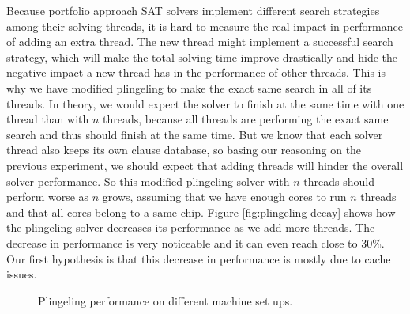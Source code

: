 \documentclass[12pt]{diicc}
\begin{document}
Because portfolio approach SAT solvers implement different search strategies among their solving threads, it is hard to measure the real impact in performance of adding an extra thread. The new thread might implement a successful search strategy, which will make the total solving time improve drastically and hide the negative impact a new thread has in the performance of other threads. This is why we have modified plingeling to make the exact same search in all of its threads. In theory, we would expect the solver to finish at the same time with one thread than with $n$ threads, because all threads are performing the exact same search and thus should finish at the same time. But we know that each solver thread also keeps its own clause database, so basing our reasoning on the previous experiment, we should expect that adding threads will hinder the overall solver performance. So this modified plingeling solver with $n$ threads should perform worse as $n$ grows, assuming that we have enough cores to run $n$ threads and that all cores belong to a same chip. Figure \ref{fig:plingeling decay} shows how the plingeling solver decreases its performance as we add more threads. The decrease in performance is very noticeable and it can even reach close to 30\%. Our first hypothesis is that this decrease in performance is mostly due to cache issues.

\begin{figure}[h!]
\begin{center}
	\caption{Plingeling performance on different machine set ups.}
	\label{fig:plingeling chips}
\end{center}
\end{figure}
\end{document}
